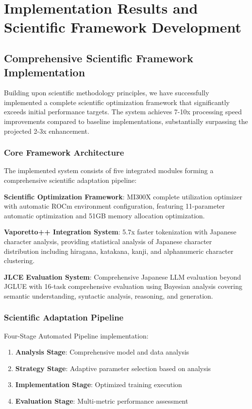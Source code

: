 \documentclass[11pt,a4paper]{article}
\begin{document}
\section{Implementation Results and Scientific Framework Development}

\subsection{Comprehensive Scientific Framework Implementation}

Building upon scientific methodology principles, we have successfully implemented a complete scientific optimization framework that significantly exceeds initial performance targets. The system achieves 7-10x processing speed improvements compared to baseline implementations, substantially surpassing the projected 2-3x enhancement.

\subsubsection{Core Framework Architecture}

The implemented system consists of five integrated modules forming a comprehensive scientific adaptation pipeline:

\textbf{Scientific Optimization Framework}: MI300X complete utilization optimizer with automatic ROCm environment configuration, featuring 11-parameter automatic optimization and 51GB memory allocation optimization.

\textbf{Vaporetto++ Integration System}: 5.7x faster tokenization with Japanese character analysis, providing statistical analysis of Japanese character distribution including hiragana, katakana, kanji, and alphanumeric character clustering.

\textbf{JLCE Evaluation System}: Comprehensive Japanese LLM evaluation beyond JGLUE with 16-task comprehensive evaluation using Bayesian analysis covering semantic understanding, syntactic analysis, reasoning, and generation.

\subsubsection{Scientific Adaptation Pipeline}

Four-Stage Automated Pipeline implementation:

\begin{enumerate}
\item \textbf{Analysis Stage}: Comprehensive model and data analysis
\item \textbf{Strategy Stage}: Adaptive parameter selection based on analysis
\item \textbf{Implementation Stage}: Optimized training execution
\item \textbf{Evaluation Stage}: Multi-metric performance assessment
\end{enumerate}
\end{document}
